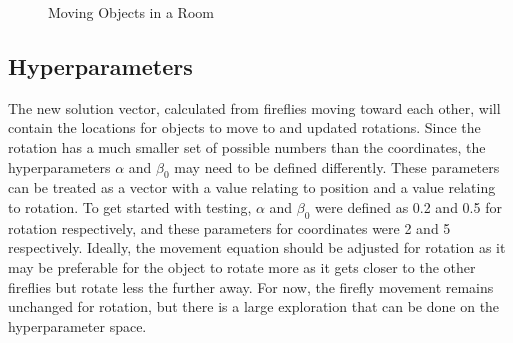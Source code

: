 \documentclass[conference]{IEEEtran}
\begin{document}
    \begin{figure}[!h]
        \centering
        \hfill
        \caption{Moving Objects in a Room}
        \label{resolving_conflicts}
    \end{figure}

    \subsection{Hyperparameters}
    The new solution vector, calculated from fireflies moving toward each other, will contain the locations for objects to move to and updated rotations. Since the rotation has a much smaller set of possible numbers than the coordinates, the hyperparameters $\alpha$ and $\beta_0$ may need to be defined differently. These parameters can be treated as a vector with a value relating to position and a value relating to rotation. To get started with testing, $\alpha$ and $\beta_0$ were defined as 0.2 and 0.5 for rotation respectively, and these parameters for coordinates were 2 and 5 respectively. Ideally, the movement equation should be adjusted for rotation as it may be preferable for the object to rotate more as it gets closer to the other fireflies but rotate less the further away. For now, the firefly movement remains unchanged for rotation, but there is a large exploration that can be done on the hyperparameter space.
\end{document}
